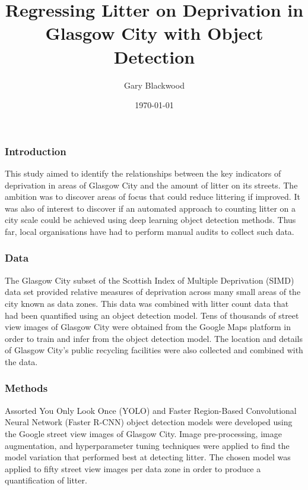 \documentclass[10pt]{article}
\begin{document}
\title{Regressing Litter on Deprivation in Glasgow City with Object Detection}
\author{Gary Blackwood}
\date{\today}
\maketitle
\thispagestyle{empty} %

\subsubsection*{Introduction}

This study aimed to identify the relationships between the key indicators of deprivation in areas of
Glasgow City and the amount of litter on its streets. The ambition was to discover areas of focus that could
reduce littering if improved. It was also of interest to discover if an automated approach to counting litter on
a city scale could be achieved using deep learning object detection methods. Thus far, local organisations
have had to perform manual audits to collect such data.

\subsubsection*{Data}

The Glasgow City subset of the Scottish Index of Multiple Deprivation (SIMD) data set provided relative measures of deprivation across many small areas of the city known as data zones. This data was combined with litter count data that had been quantified using an object detection model. Tens of thousands of street view images of Glasgow City were obtained from the Google Maps platform in order to train and infer from the object detection model. The location and details of Glasgow City's public recycling facilities were also collected and combined with the data.


\subsubsection*{Methods}

Assorted You Only Look Once (YOLO) and Faster Region-Based Convolutional Neural Network (Faster R-CNN) object detection models were developed using the Google street view images of Glasgow City. Image pre-processing, image augmentation, and hyperparameter tuning techniques were applied to find the model variation that performed best at detecting litter. The chosen model was applied to fifty street view images per data zone in order to produce a quantification of litter.
\end{document}
